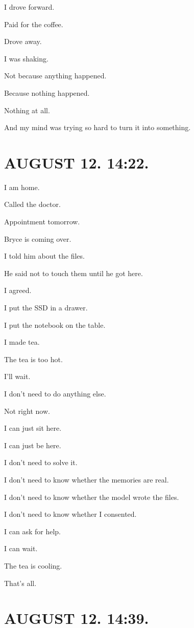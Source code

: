 \documentclass[11pt,oneside]{book}
\begin{document}
I drove forward.

Paid for the coffee.

Drove away.

I was shaking.

Not because anything happened.

Because nothing happened.

Nothing at all.

And my mind was trying so hard to turn it into something.

\section*{AUGUST 12. 14:22.}

I am home.

Called the doctor.

Appointment tomorrow.

Bryce is coming over.

I told him about the files.

He said not to touch them until he got here.

I agreed.

I put the SSD in a drawer.

I put the notebook on the table.

I made tea.

The tea is too hot.

I'll wait.

I don't need to do anything else.

Not right now.

I can just sit here.

I can just be here.

I don't need to solve it.

I don't need to know whether the memories are real.

I don't need to know whether the model wrote the files.

I don't need to know whether I consented.

I can ask for help.

I can wait.

The tea is cooling.

That's all.

\section*{AUGUST 12. 14:39.}
\end{document}
